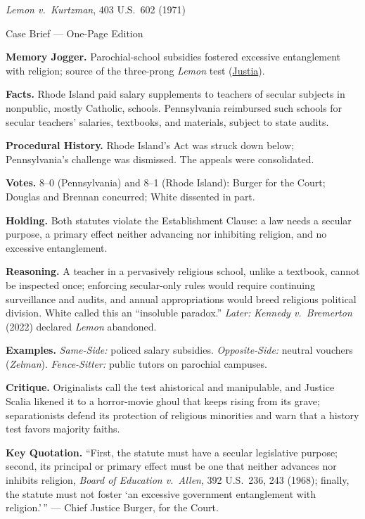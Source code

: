 \documentclass[12pt]{article}
\begin{document}
\begin{center}
{\Large \textit{Lemon v.\ Kurtzman}, 403 U.S.\ 602 (1971)\par}
\vspace{0.3em}
{\normalsize Case Brief --- One-Page Edition\par}
\end{center}

\textbf{Memory Jogger.} Parochial-school subsidies fostered excessive entanglement with religion; source of the three-prong \textit{Lemon} test (\href{https://supreme.justia.com/cases/federal/us/403/602/}{Justia}).

\textbf{Facts.} Rhode Island paid salary supplements to teachers of secular subjects in nonpublic, mostly Catholic, schools. Pennsylvania reimbursed such schools for secular teachers' salaries, textbooks, and materials, subject to state audits.

\textbf{Procedural History.} Rhode Island's Act was struck down below; Pennsylvania's challenge was dismissed. The appeals were consolidated.

\textbf{Votes.} 8--0 (Pennsylvania) and 8--1 (Rhode Island): Burger for the Court; Douglas and Brennan concurred; White dissented in part.

\textbf{Holding.} Both statutes violate the Establishment Clause: a law needs a secular purpose, a primary effect neither advancing nor inhibiting religion, and no excessive entanglement.

\textbf{Reasoning.} A teacher in a pervasively religious school, unlike a textbook, cannot be inspected once; enforcing secular-only rules would require continuing surveillance and audits, and annual appropriations would breed religious political division. White called this an ``insoluble paradox.'' \emph{Later:} \textit{Kennedy v.\ Bremerton} (2022) declared \textit{Lemon} abandoned.

\textbf{Examples.} \emph{Same-Side:} policed salary subsidies. \emph{Opposite-Side:} neutral vouchers (\textit{Zelman}). \emph{Fence-Sitter:} public tutors on parochial campuses.

\textbf{Critique.} Originalists call the test ahistorical and manipulable, and Justice Scalia likened it to a horror-movie ghoul that keeps rising from its grave; separationists defend its protection of religious minorities and warn that a history test favors majority faiths.

\textbf{Key Quotation.} ``First, the statute must have a secular legislative purpose; second, its principal or primary effect must be one that neither advances nor inhibits religion, \textit{Board of Education v.\ Allen}, 392 U.S.\ 236, 243 (1968); finally, the statute must not foster `an excessive government entanglement with religion.'\,'' --- Chief Justice Burger, for the Court.
\end{document}
